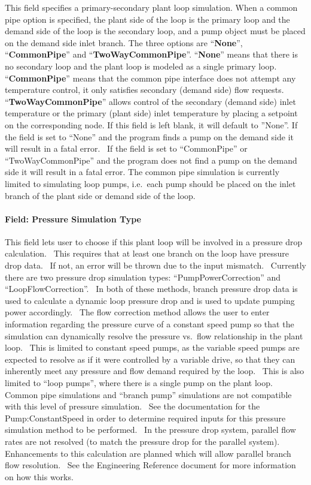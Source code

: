 This field specifies a primary-secondary plant loop simulation. When a common pipe option is specified, the plant side of the loop is the primary loop and the demand side of the loop is the secondary loop, and a pump object must be placed on the demand side inlet branch. The three options are ``\textbf{None}'', ``\textbf{CommonPipe}'' and ``\textbf{TwoWayCommonPipe}''. ``\textbf{None}'' means that there is no secondary loop and the plant loop is modeled as a single primary loop. ``\textbf{CommonPipe}'' means that the common pipe interface does not attempt any temperature control, it only satisfies secondary (demand side) flow requests. ``\textbf{TwoWayCommonPipe}'' allows control of the secondary (demand side) inlet temperature or the primary (plant side) inlet temperature by placing a setpoint on the corresponding node. If this field is left blank, it will default to ''None''. If the field is set to ``None'' and the program finds a pump on the demand side it will result in a fatal error.~ If the field is set to ``CommonPipe'' or ``TwoWayCommonPipe'' and the program does not find a pump on the demand side it will result in a fatal error. The common pipe simulation is currently limited to simulating loop pumps, i.e.~each pump should be placed on the inlet branch of the plant side or demand side of the loop.

\paragraph{Field: Pressure Simulation Type}\label{field-pressure-simulation-type}

This field lets user to choose if this plant loop will be involved in a pressure drop calculation.~ This requires that at least one branch on the loop have pressure drop data.~ If not, an error will be thrown due to the input mismatch.~ Currently there are two pressure drop simulation types: ``PumpPowerCorrection'' and ``LoopFlowCorrection''.~ In both of these methods, branch pressure drop data is used to calculate a dynamic loop pressure drop and is used to update pumping power accordingly.~ The flow correction method allows the user to enter information regarding the pressure curve of a constant speed pump so that the simulation can dynamically resolve the pressure vs.~flow relationship in the plant loop.~ This is limited to constant speed pumps, as the variable speed pumps are expected to resolve as if it were controlled by a variable drive, so that they can inherently meet any pressure and flow demand required by the loop.~ This is also limited to ``loop pumps'', where there is a single pump on the plant loop. Common pipe simulations and ``branch pump'' simulations are not compatible with this level of pressure simulation.~ See the documentation for the Pump:ConstantSpeed in order to determine required inputs for this pressure simulation method to be performed.~ In the pressure drop system, parallel flow rates are not resolved (to match the pressure drop for the parallel system).~ Enhancements to this calculation are planned which will allow parallel branch flow resolution.~ See the Engineering Reference document for more information on how this works.

